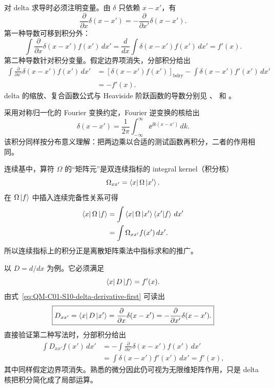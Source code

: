 对 delta 求导时必须注明变量。由 $\delta$ 只依赖 $x-x'$，有
\begin{equation}
  \frac{\partial}{\partial x}\delta(x-x')
  =-\frac{\partial}{\partial x'}\delta(x-x').
  \label{eq:QM-C01-S10-delta-derivative-sign}
\end{equation}
第一种导数可移到积分外：
\begin{equation}
  \int \frac{\partial}{\partial x}\delta(x-x')f(x')\,dx'
  =\frac{d}{dx}\int\delta(x-x')f(x')\,dx'
  =f'(x).
  \label{eq:QM-C01-S10-delta-derivative-first}
\end{equation}
第二种导数针对积分变量。假定边界项消失，分部积分给出
\begin{align}
  \int \frac{\partial}{\partial x'}\delta(x-x')f(x')\,dx'
  &=\left[\delta(x-x')f(x')\right]_{\mathrm{bdry}}
    -\int\delta(x-x')f'(x')\,dx' \\
  &=-f'(x).
  \label{eq:QM-C01-S10-delta-derivative-second}
\end{align}
delta 的缩放、复合函数公式与 Heaviside 阶跃函数的导数分别见
、
和
。

采用对称归一化的 Fourier 变换约定，Fourier 逆变换的核给出
\begin{equation}
  \boxed{
  \delta(x-x')
  =\frac1{2\pi}
  \int_{-\infty}^{\infty}\ee^{\ii k(x-x')}\,dk.}
  \label{eq:QM-C01-S10-delta-fourier}
\end{equation}
该积分同样按分布意义理解：把两边乘以合适的测试函数再积分，二者的作用相同。


连续基中，算符 $\Omega$ 的“矩阵元”是双连续指标的 integral kernel（积分核）
\begin{equation}
  \Omega_{xx'}=\left\langle x\right|\Omega\left|x'\right\rangle.
  \label{eq:QM-C01-S10-operator-kernel}
\end{equation}
在 $\Omega\left|f\right\rangle$ 中插入连续完备性关系可得
\begin{align}
  \left\langle x\right|\Omega\left|f\right\rangle
  &=\int\left\langle x\right|\Omega\left|x'\right\rangle\left\langle x' \middle| f \right\rangle\,dx' \\
  &=\int\Omega_{xx'}f(x')\,dx'.
  \label{eq:QM-C01-S10-kernel-action}
\end{align}
所以连续指标上的积分正是离散矩阵乘法中指标求和的推广。

以 $D=d/dx$ 为例。它必须满足
\[
  \left\langle x\right|D\left|f\right\rangle=f'(x).
\]
由式~\eqref{eq:QM-C01-S10-delta-derivative-first} 可读出
\begin{equation}
  \boxed{
  D_{xx'}=\left\langle x\right|D\left|x'\right\rangle
  =\frac{\partial}{\partial x}\delta(x-x')
  =-\frac{\partial}{\partial x'}\delta(x-x').}
  \label{eq:QM-C01-S10-derivative-kernel}
\end{equation}
直接验证第二种写法时，分部积分给出
\begin{align}
  \int D_{xx'}f(x')\,dx'
  &=-\int\frac{\partial}{\partial x'}
       \delta(x-x')f(x')\,dx' \\
  &=\int\delta(x-x')f'(x')\,dx'=f'(x),
  \label{eq:QM-C01-S10-derivative-kernel-check}
\end{align}
其中同样假定边界项消失。熟悉的微分因此仍可视为无限维矩阵作用，只是 delta 核把积分简化成了局部运算。

